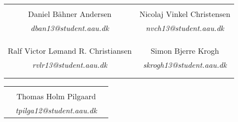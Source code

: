 \begin{table}[H]
	\centering
		\begin{tabular}{c c }
			\underline{\phantom{mmmmmmmmmmmmmmmmmmm}}       & \underline{\phantom{mmmmmmmmmmmmmmmmmmm}} \\
			Daniel Bähner Andersen			 & Nicolaj Vinkel Christensen  \\
			\textit{dban13@student.aau.dk} & \textit{nvch13@student.aau.dk}\\
			&\\
			&\\
			\underline{\phantom{mmmmmmmmmmmmmmmmmmm}}       & \underline{\phantom{mmmmmmmmmmmmmmmmmmm}} \\
			Ralf Victor Lømand R. Christiansen			 & Simon Bjerre Krogh\\
			\textit{rvlr13@student.aau.dk} & \textit{skrogh13@student.aau.dk} \\
			&\\
			&\\	
		\end{tabular}
		\begin{tabular}{c c c}
			& \underline{\phantom{mmmmmmmmmmmmmmmmmmm}} 	& \\
			& Thomas Holm Pilgaard 					& \\
			& \textit{tpilga12@student.aau.dk}		& \\
		\end{tabular}
\end{table}